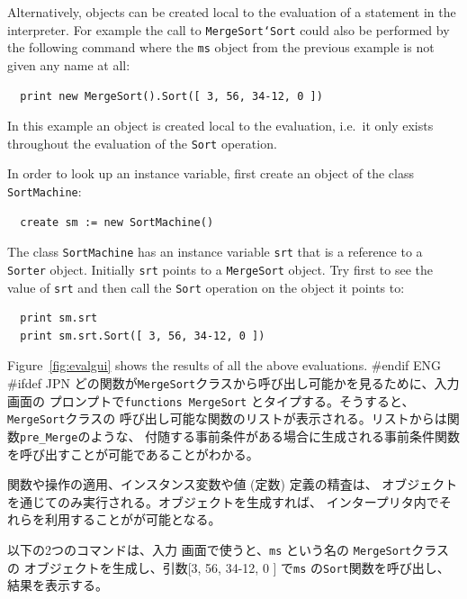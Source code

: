 \documentclass[\pformat,12pt]{article}
\newcommand{\aaa}{\tt }
\newcommand{\cmd}{\tt }
\newcommand{\guicmd}[1]{{\sf #1}}
\newcommand{\guicmd}[1]{{\gt #1}}
\begin{document}
Alternatively, objects can 
be created local to the evaluation of a statement in the interpreter.
 For example the call to {\tt MergeSort`Sort}
could also be performed by the following command where the {\tt ms}
object from the previous example is not given any name at all:

\begin{verbatim}
  print new MergeSort().Sort([ 3, 56, 34-12, 0 ])
\end{verbatim}

In this example an object is created local to the evaluation, i.e.\ 
it only exists throughout the evaluation of the {\tt Sort} operation.

In order to look up an instance variable, first create an object of
the class {\tt SortMachine}:

\begin{verbatim}
  create sm := new SortMachine()
\end{verbatim}

The class {\tt SortMachine} has an instance variable {\tt srt} that is
a reference to a {\tt Sorter} object.  Initially {\tt srt} points
to a {\tt MergeSort} object.  Try first to see the value of {\tt srt}
and then call the {\tt Sort} operation on the object it points to:

\begin{verbatim}
  print sm.srt
  print sm.srt.Sort([ 3, 56, 34-12, 0 ])
\end{verbatim}

Figure~\ref{fig:evalgui} shows the results of all the above
evaluations.
#endif ENG
#ifdef JPN
どの関数が{\aaa MergeSort}クラスから呼び出し可能かを見るために、\guicmd{入力} 画面の
プロンプトで{\cmd functions MergeSort} とタイプする。そうすると、{\aaa MergeSort}クラスの
呼び出し可能な関数のリストが表示される。リストからは関数{\aaa pre\_Merge}のような、
付随する事前条件がある場合に生成される事前条件関数
を呼び出すことが可能であることがわかる。

関数や操作の適用、インスタンス変数や値 (定数) 定義の精査は、
オブジェクトを通じてのみ実行される。オブジェクトを生成すれば、
インタープリタ内でそれらを利用することがが可能となる。

以下の2つのコマンドは、\guicmd{入力} 画面で使うと、{\aaa ms} という名の {\aaa MergeSort}クラスの
オブジェクトを生成し、引数[3, 56, 34-12, 0 ] で{\tt ms} の{\tt Sort}関数を呼び出し、
結果を表示する。
\end{document}
